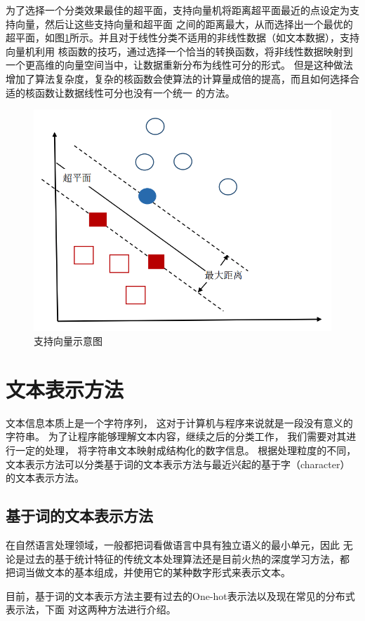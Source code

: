 \documentclass{standalone}
\begin{document}
为了选择一个分类效果最佳的超平面，支持向量机将距离超平面最近的点设定为支持向量，然后让这些支持向量和超平面
之间的距离最大，从而选择出一个最优的超平面，如图\ref{svm}所示。并且对于线性分类不适用的非线性数据（如文本数据），支持向量机利用
核函数的技巧，通过选择一个恰当的转换函数，将非线性数据映射到一个更高维的向量空间当中，让数据重新分布为线性可分的形式。
但是这种做法增加了算法复杂度，复杂的核函数会使算法的计算量成倍的提高，而且如何选择合适的核函数让数据线性可分也没有一个统一
的方法。
\begin{figure}[h]
    \includegraphics[scale=0.35]{picture/svm.png}
    \caption{支持向量示意图}
    \label{svm}
\end{figure}
\fi
\section{文本表示方法}
文本信息本质上是一个字符序列，
这对于计算机与程序来说就是一段没有意义的字符串。
为了让程序能够理解文本内容，继续之后的分类工作，
我们需要对其进行一定的处理，
将字符串文本映射成结构化的数字信息。
根据处理粒度的不同，文本表示方法可以分类基于词的文本表示方法与最近兴起的基于字（character）
的文本表示方法。
\subsection{基于词的文本表示方法}
在自然语言处理领域，一般都把词看做语言中具有独立语义的最小单元，因此
无论是过去的基于统计特征的传统文本处理算法还是目前火热的深度学习方法，都
把词当做文本的基本组成，并使用它的某种数字形式来表示文本。

目前，基于词的文本表示方法主要有过去的One-hot表示法以及现在常见的分布式表示法，下面
对这两种方法进行介绍。
\end{document}
